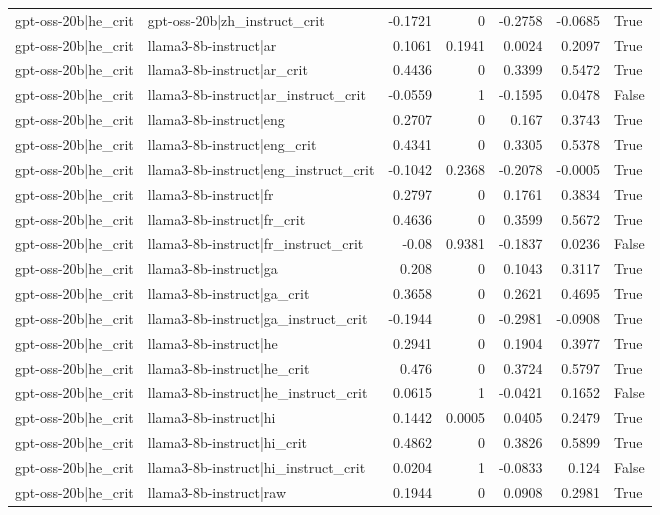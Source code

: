 \begin{table}
\begin{tabular}{l l r r r r l}
gpt-oss-20b|he_crit & gpt-oss-20b|zh_instruct_crit & -0.1721 & 0 & -0.2758 & -0.0685 & True \\
gpt-oss-20b|he_crit & llama3-8b-instruct|ar & 0.1061 & 0.1941 & 0.0024 & 0.2097 & True \\
gpt-oss-20b|he_crit & llama3-8b-instruct|ar_crit & 0.4436 & 0 & 0.3399 & 0.5472 & True \\
gpt-oss-20b|he_crit & llama3-8b-instruct|ar_instruct_crit & -0.0559 & 1 & -0.1595 & 0.0478 & False \\
gpt-oss-20b|he_crit & llama3-8b-instruct|eng & 0.2707 & 0 & 0.167 & 0.3743 & True \\
gpt-oss-20b|he_crit & llama3-8b-instruct|eng_crit & 0.4341 & 0 & 0.3305 & 0.5378 & True \\
gpt-oss-20b|he_crit & llama3-8b-instruct|eng_instruct_crit & -0.1042 & 0.2368 & -0.2078 & -0.0005 & True \\
gpt-oss-20b|he_crit & llama3-8b-instruct|fr & 0.2797 & 0 & 0.1761 & 0.3834 & True \\
gpt-oss-20b|he_crit & llama3-8b-instruct|fr_crit & 0.4636 & 0 & 0.3599 & 0.5672 & True \\
gpt-oss-20b|he_crit & llama3-8b-instruct|fr_instruct_crit & -0.08 & 0.9381 & -0.1837 & 0.0236 & False \\
gpt-oss-20b|he_crit & llama3-8b-instruct|ga & 0.208 & 0 & 0.1043 & 0.3117 & True \\
gpt-oss-20b|he_crit & llama3-8b-instruct|ga_crit & 0.3658 & 0 & 0.2621 & 0.4695 & True \\
gpt-oss-20b|he_crit & llama3-8b-instruct|ga_instruct_crit & -0.1944 & 0 & -0.2981 & -0.0908 & True \\
gpt-oss-20b|he_crit & llama3-8b-instruct|he & 0.2941 & 0 & 0.1904 & 0.3977 & True \\
gpt-oss-20b|he_crit & llama3-8b-instruct|he_crit & 0.476 & 0 & 0.3724 & 0.5797 & True \\
gpt-oss-20b|he_crit & llama3-8b-instruct|he_instruct_crit & 0.0615 & 1 & -0.0421 & 0.1652 & False \\
gpt-oss-20b|he_crit & llama3-8b-instruct|hi & 0.1442 & 0.0005 & 0.0405 & 0.2479 & True \\
gpt-oss-20b|he_crit & llama3-8b-instruct|hi_crit & 0.4862 & 0 & 0.3826 & 0.5899 & True \\
gpt-oss-20b|he_crit & llama3-8b-instruct|hi_instruct_crit & 0.0204 & 1 & -0.0833 & 0.124 & False \\
gpt-oss-20b|he_crit & llama3-8b-instruct|raw & 0.1944 & 0 & 0.0908 & 0.2981 & True \\

\end{tabular}
\end{table}
